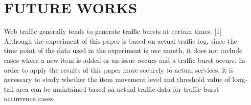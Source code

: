 \documentclass[sigconf,anonymous=true]{acmart}
\begin{document}
%
%
\section{FUTURE WORKS}
Web traffic generally tends to generate traffic bursts at certain times. [1] Although the experiment of this paper is based on actual traffic log, since the time point of the data used in the experiment is one month, it does not include cases where a new item is added or an issue occurs and a traffic burst occurs.
In order to apply the results of this paper more securely to actual services, it is necessary to study whether the item movement level and threshold value of long-tail area can be maintained based on actual traffic data for traffic burst occurrence cases.



\nocite{*}


\end{document}
